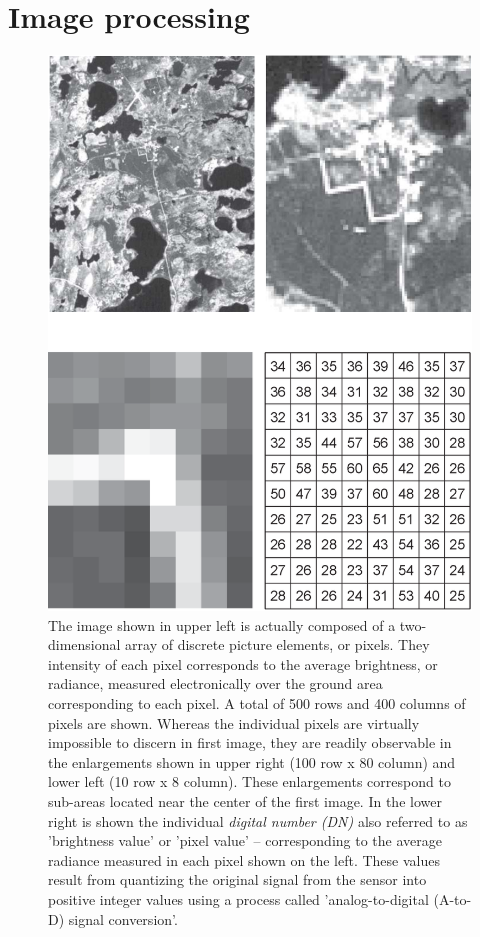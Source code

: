 \documentclass[10pt,dvipsnames,ignorenonframetext,aspectratio=169]{beamer}
\begin{document}
\hypertarget{image-processing}{%
\section{Image processing}\label{image-processing}}

\begin{frame}{}
\protect\hypertarget{section-9}{}
\begin{figure}
  \begin{columns}[T,onlytextwidth]
  \begin{center}
  \includegraphics[width=0.48\linewidth]{../images/features_of_digital_image.PNG}
  \end{center}
  
  \caption{\newline\tiny The image shown in upper left is actually composed of a two-dimensional array of discrete picture elements, or pixels. They intensity of each pixel corresponds to the average brightness, or radiance, measured electronically over the ground area corresponding to each pixel. A total of 500 rows and 400 columns of pixels are shown. Whereas the individual pixels are virtually impossible to discern in first image, they are readily observable in the enlargements shown in upper right (100 row x 80 column) and lower left (10 row x 8 column). These enlargements correspond to sub-areas located near the center of the first image. In the lower right is shown the individual \textit{digital number (DN)} also referred to as 'brightness value' or 'pixel value' -- corresponding to the average radiance measured in each pixel shown on the left. These values result from quantizing the original signal from the sensor into positive integer values using a process called 'analog-to-digital (A-to-D) signal conversion'.}
  \label{fig:features-digital-image}
  
  \end{columns}
\end{figure}
\end{frame}
\end{document}
